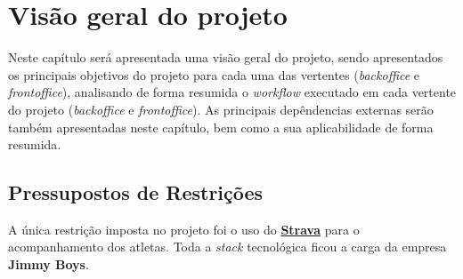 \chapter{Visão geral do projeto}

Neste capítulo será apresentada uma visão geral do projeto, sendo apresentados os principais objetivos do projeto para cada uma das vertentes (\textit{backoffice} e \textit{frontoffice}), analisando de forma resumida o \textit{workflow} executado em cada vertente do projeto (\textit{backoffice} e \textit{frontoffice}). As principais depêndencias externas serão também apresentadas neste capítulo, bem como a sua aplicabilidade de forma resumida.





\section{Pressupostos de Restrições}

A única restrição imposta no projeto foi o uso do \textbf{\href{https://www.strava.com/?hl=pt-PT}{Strava}} para o acompanhamento dos atletas. Toda a \textit{stack} tecnológica ficou a carga da empresa \textbf{Jimmy Boys}.

